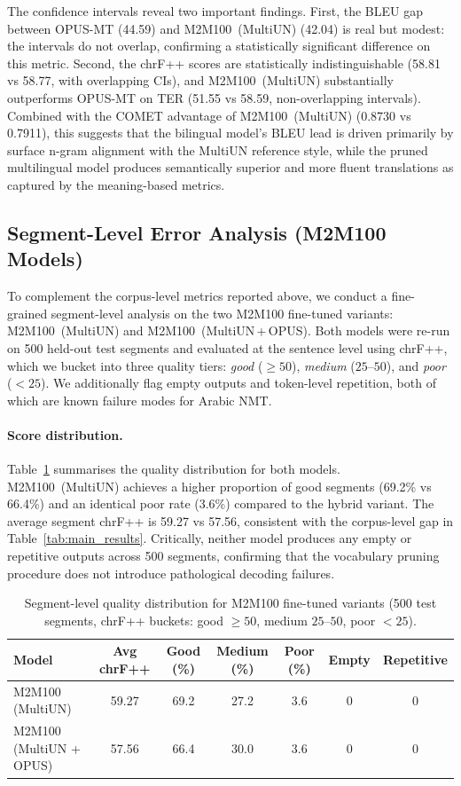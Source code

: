 \documentclass{article}
\begin{document}
	The confidence intervals reveal two important findings. First, the BLEU gap
	between OPUS-MT (44.59) and M2M100~(MultiUN) (42.04) is real but modest: the
	intervals do not overlap, confirming a statistically significant difference on
	this metric. Second, the chrF++ scores are statistically indistinguishable
	(58.81 vs 58.77, with overlapping CIs), and M2M100~(MultiUN) substantially
	outperforms OPUS-MT on TER (51.55 vs 58.59, non-overlapping intervals). Combined
	with the COMET advantage of M2M100~(MultiUN) (0.8730 vs 0.7911), this
	suggests that the bilingual model's BLEU lead is driven primarily by surface
	n-gram alignment with the MultiUN reference style, while the pruned multilingual
	model produces semantically superior and more fluent translations as captured
	by the meaning-based metrics.
	
	\subsection{Segment-Level Error Analysis (M2M100 Models)}
	\label{sec:error}
	
	To complement the corpus-level metrics reported above, we conduct a fine-grained
	segment-level analysis on the two M2M100 fine-tuned variants: M2M100~(MultiUN) and
	M2M100~(MultiUN\,+\,OPUS). Both models were re-run on 500 held-out test segments and
	evaluated at the sentence level using chrF++, which we bucket into three quality tiers:
	\emph{good} ($\geq 50$), \emph{medium} ($25$--$50$), and \emph{poor} ($<25$). We
	additionally flag empty outputs and token-level repetition, both of which are known failure
	modes for Arabic NMT.
	
	\paragraph{Score distribution.}
	Table~\ref{tab:error_dist} summarises the quality distribution for both models.
	M2M100~(MultiUN) achieves a higher proportion of good segments (69.2\% vs 66.4\%)
	and an identical poor rate (3.6\%) compared to the hybrid variant. The average segment
	chrF++ is 59.27 vs 57.56, consistent with the corpus-level gap in Table~\ref{tab:main_results}.
	Critically, neither model produces any empty or repetitive outputs across 500 segments,
	confirming that the vocabulary pruning procedure does not introduce pathological decoding
	failures.
	\begin{table}[h]
		\caption{Segment-level quality distribution for M2M100 fine-tuned variants
			(500 test segments, chrF++ buckets: good $\geq 50$, medium $25$--$50$, poor $<25$).}
		\label{tab:error_dist}
		\centering
		\small
		\begin{tabular}{lcccccc}
			\toprule
			\textbf{Model} & \textbf{Avg chrF++} & \textbf{Good (\%)} & \textbf{Medium (\%)} & \textbf{Poor (\%)} & \textbf{Empty} & \textbf{Repetitive} \\
			\midrule
			M2M100 (MultiUN)        & 59.27 & 69.2 & 27.2 & 3.6 & 0 & 0 \\
			M2M100 (MultiUN + OPUS) & 57.56 & 66.4 & 30.0 & 3.6 & 0 & 0 \\
			\bottomrule
		\end{tabular}
	\end{table}
	
\end{document}
